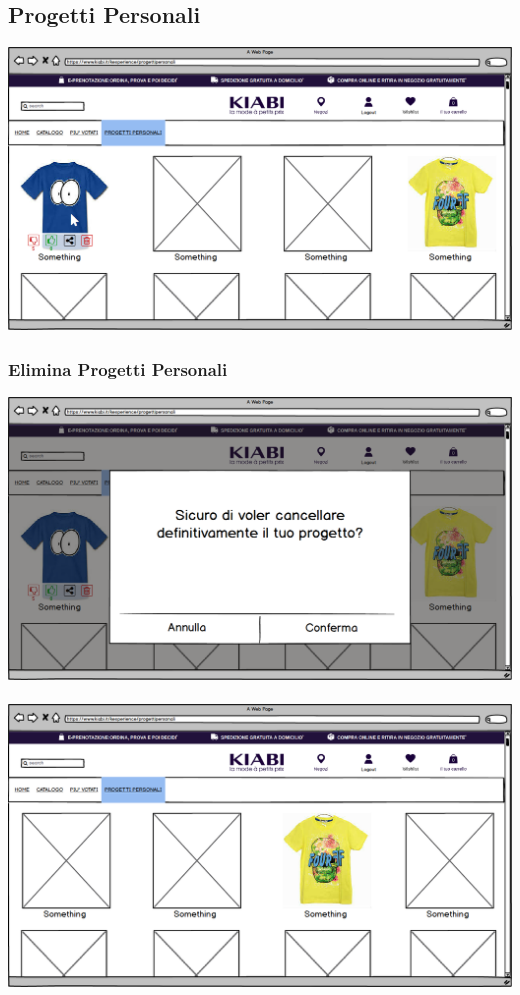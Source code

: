 \documentclass[12pt,italian,]{report}
\begin{document}
\subsection{Progetti Personali} 
\includegraphics{balsamiq/Progetti Personali.png}
\subsubsection{Elimina Progetti Personali} 
\includegraphics{balsamiq/Progetti Personali eliminazione.png}
\\
\\
\includegraphics{balsamiq/Progetti Personali eliminazione post eliminazione.png}
\end{document}
